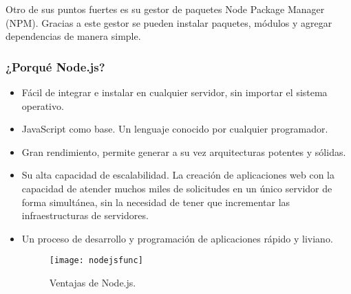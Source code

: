 

Otro de sus puntos fuertes es su gestor de paquetes Node Package Manager  (NPM). Gracias a este gestor se pueden instalar paquetes, módulos y agregar dependencias de manera simple.

\subsubsection{¿Porqué Node.js?}
\begin{itemize}
    \item Fácil de integrar e instalar en cualquier servidor, sin importar el sistema operativo.
    \item JavaScript como base. Un lenguaje conocido por cualquier programador.
    \item Gran rendimiento, permite generar a su vez arquitecturas potentes y sólidas.
    \item Su alta capacidad de escalabilidad. La creación de aplicaciones web con la capacidad de atender muchos miles de solicitudes en un único servidor de forma simultánea, sin la necesidad de tener que incrementar las infraestructuras de servidores.
    \item Un proceso de desarrollo y programación de aplicaciones rápido y liviano.
        
    \begin{figure}[h]
        \centering
        \texttt{[image: nodejsfunc]}
        \caption{Ventajas de Node.js.}
        \label{fig:nodejsVentajas}
    \end{figure}
\end{itemize}


